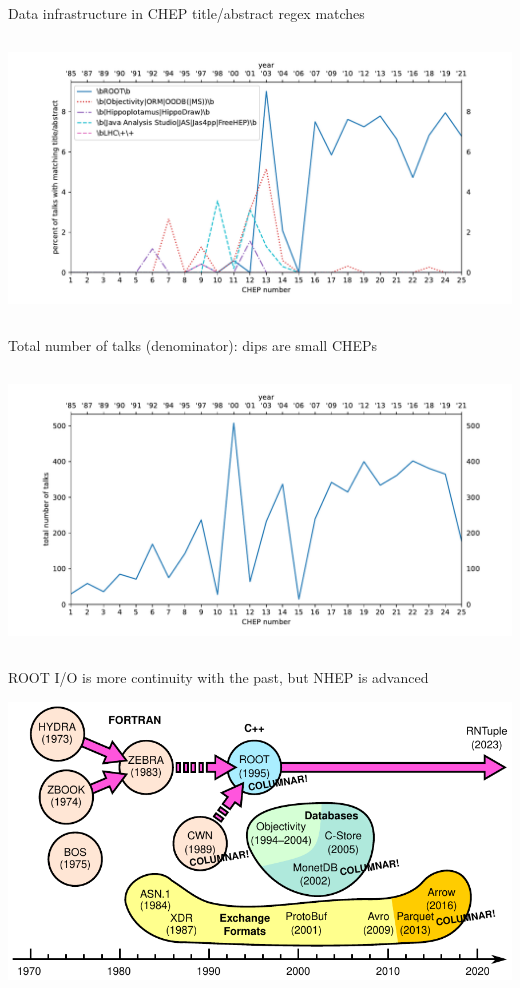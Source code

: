 \documentclass[aspectratio=169]{beamer}
\begin{document}
\begin{frame}{Data infrastructure in CHEP title/abstract regex matches}
\vspace{0.15 cm}
\begin{columns}
\includegraphics[width=\linewidth]{PLOTS/chep-papers-package-1.pdf}
\end{columns}
\end{frame}

\begin{frame}{Total number of talks (denominator): dips are small CHEPs}
\vspace{0.15 cm}
\begin{columns}
\includegraphics[width=\linewidth]{PLOTS/chep-papers-denominator.pdf}
\end{columns}
\end{frame}

\begin{frame}{ROOT I/O is more continuity with the past, but NHEP is advanced}
\vspace{0.1 cm}
\begin{center}
\includegraphics[width=\linewidth]{PLOTS/history.pdf}
\end{center}
\end{frame}
\end{document}
